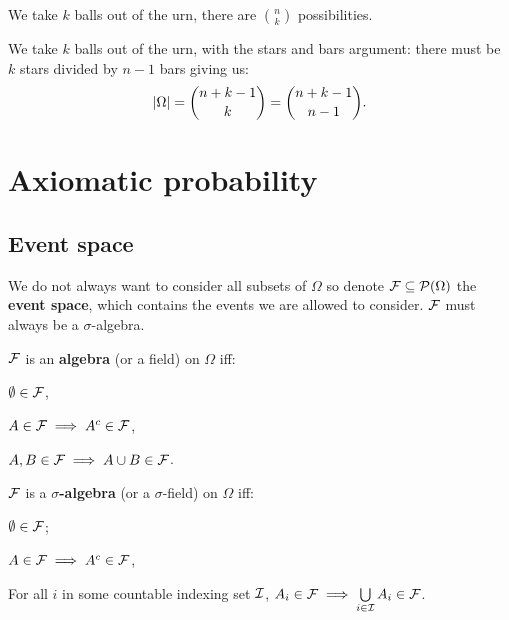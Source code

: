 \begin{definition}
    We take $k$ balls out of the urn, there are $\binom{n}{k}$ possibilities.
\end{definition}

\begingroup\belowdisplayskip=-10pt
    \begin{definition}
        We take $k$ balls out of the urn, with the stars and bars argument: there must be $k$ stars divided by $n-1$ bars giving us:
        \[
        |\Omega| = \binom{n+k-1}{k} = \binom{n+k-1}{n-1}\textcolor{black}{.}
        \]
    \end{definition}
\endgroup


\section{Axiomatic probability}
\subsection{Event space}
We do not always want to consider all subsets of $\Omega$ so denote $\mathcal{F} \subseteq \mathcal{P}(\Omega)$ the \textbf{event space}, which contains the events we are allowed to consider. $\mathcal{F}$ must always be a $\sigma$-algebra.

\begin{definition}[Algebra]
    $\mathcal{F}$ is an \textbf{algebra} (or a field) on $\Omega$ iff:\\
    \begin{enumerate*}
        \item $\emptyset \in \mathcal{F}$, \hspace{100pt}
        \item $A \in \mathcal{F} \implies A^c \in \mathcal{F}$, \hspace{100pt}
        \item $A,B \in \mathcal{F} \implies A\cup B \in \mathcal{F}$.
    \end{enumerate*}
\end{definition}

\begin{definition}
    $\mathcal{F}$ is a \textbf{$\sigma$-algebra} (or a $\sigma$-field) on $\Omega$ iff:\\
    \begin{enumerate*}
        \item $\emptyset \in \mathcal{F}$; \hspace{15pt}
        \item $A \in \mathcal{F} \implies A^c \in \mathcal{F}$, \hspace{15pt}
        \item For all $i$ in some countable indexing set $\mathcal{I}$, $A_i \in \mathcal{F} \implies \bigcup\limits_{i\in \mathcal{I}}A_i \in \mathcal{F}$.
    \end{enumerate*}
\end{definition}

